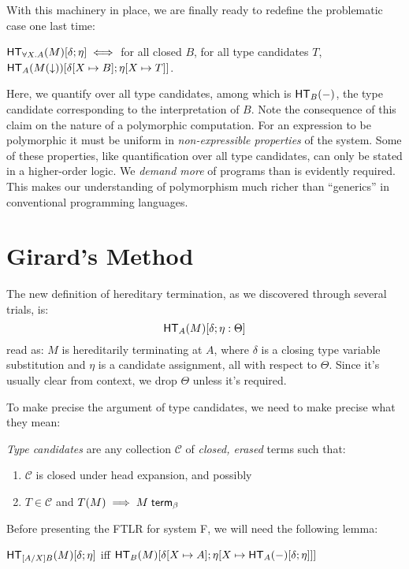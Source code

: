 \documentclass{article}
\begin{document}
With this machinery in place, we are finally ready to redefine the problematic case one last time:

$\mathsf{HT}_{\forall X. A}(M)[\delta;\eta] \iff $ for all closed $B$, for all type candidates $T$,
$\mathsf{HT}_{A}(M(\downarrow))[\delta[X \mapsto B];\eta[X \mapsto T]]$.

Here, we quantify over all type candidates, among which is $\mathsf{HT}_{B}(-)$, the type candidate corresponding
to the interpretation of $B$. Note the consequence of this claim on the nature of a polymorphic
computation. For an expression to be polymorphic it must be uniform in \emph{non-expressible properties}
of the system. Some of these properties, like quantification over all type candidates, can only
be stated in a higher-order logic. We \emph{demand more} of programs than is evidently required.
This makes our understanding of polymorphism much richer than
``generics'' in conventional programming languages.

\section{Girard's Method}

The new definition of hereditary termination, as we discovered through several trials, is:
\[
\mathsf{HT}_{A}(M)[\delta;\eta : \Theta]
\]
read as: $M$ is hereditarily terminating at $A$, where $\delta$ is a closing type variable substitution
and $\eta$ is a candidate assignment, all with respect to $\Theta$. Since it's usually clear from
context, we drop $\Theta$ unless it's required.

To make precise the argument of type candidates, we need to make precise what they mean:

\emph{Type candidates} are any collection $\mathcal{C}$ of \emph{closed, erased} terms such that:
\begin{enumerate}
\item $\mathcal{C}$ is closed under head expansion, and possibly
\item $T \in \mathcal{C}$ and $T(M) \implies {M} \; \mathsf{term}_{\beta}$
\end{enumerate}

Before presenting the FTLR for system F, we will need the following lemma:
\begin{lemma}[Compositionality]\label{lem:comp}
$\mathsf{HT}_{[A/X]B}(M)[\delta;\eta]$ iff $\mathsf{HT}_{B}(M)[\delta[X \mapsto A];\eta[X \mapsto \mathsf{HT}_{A}(-)[\delta;\eta]]]$
\end{lemma}
\end{document}
